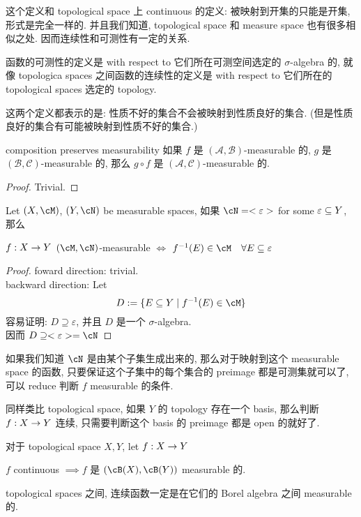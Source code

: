 \documentclass[lang=cn,11pt]{elegantbook}
\begin{document}
这个定义和 topological space 上 continuous 的定义: 被映射到开集的只能是开集, 形式是完全一样的. 并且我们知道, topological space 和 measure space 也有很多相似之处. 因而连续性和可测性有一定的关系.

函数的可测性的定义是 with respect to 它们所在可测空间选定的 $\sigma$-algebra 的, 就像 topologica spaces 之间函数的连续性的定义是 with respect to 它们所在的 topological spaces 选定的 topology.

这两个定义都表示的是: 性质不好的集合不会被映射到性质良好的集合. (但是性质良好的集合有可能被映射到性质不好的集合.)


\begin{proposition}{composition preserves measurability}
    如果 $f$ 是 $(\mathcal{A},\mathcal{B})$-measurable 的, $g$ 是 $(\mathcal{B}, \mathcal{C})$-measurable 的, 那么 $g \circ f$ 是 $(\mathcal{A}, \mathcal{C})$-measurable 的.
\end{proposition}
\begin{proof}
    Trivial.
\end{proof}

\begin{lemma}
    Let $(X,\cM)$, $(Y,\cN)$ be measurable spaces, 如果 $\cN = <\varepsilon>$ for some $\varepsilon \subseteq Y$, 那么 
\begin{center}
    $f: X \rightarrow Y$  $(\cM,\cN)$-measurable  $\Longleftrightarrow$ $f^{-1}(E) \in \cM  \quad \forall E \sub \varepsilon$
\end{center}

\end{lemma}
\begin{proof}
foward direction: trivial.\\
backward direction: Let
$$
D: = \{ E \sub Y \mid f^{-1}(E) \in \cM\}
$$
容易证明: $D \supseteq \varepsilon$, 并且 $D$ 是一个 $\sigma$-algebra.\\
因而 $D \supseteq <\varepsilon> = \cN$
\end{proof}
\begin{remark}
    如果我们知道 $\cN$ 是由某个子集生成出来的, 那么对于映射到这个 measurable space 的函数, 只要保证这个子集中的每个集合的 preimage 都是可测集就可以了, 可以 reduce 判断 $f$ measurable 的条件.

    同样类比 topological space, 如果 $Y$ 的 topology 存在一个 basis, 那么判断 $f: X\rightarrow Y$ 连续, 只需要判断这个 basis 的 preimage 都是 open 的就好了.
\end{remark}

\begin{proposition}
对于 topological space $X,Y$, let $f:X\rightarrow Y$
\begin{center}
    $f$ continuous $\implies$$f$ 是 $(\cB(X),\cB(Y))$ measurable 的.
\end{center}
\end{proposition}
\begin{remark}
    topological spaces 之间, 连续函数一定是在它们的 Borel algebra 之间 measurable 的.
\end{remark}
\end{document}
